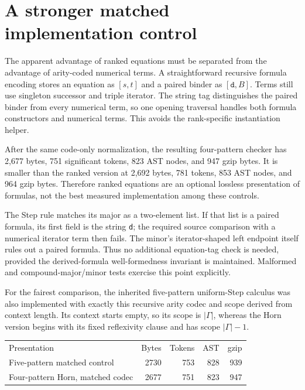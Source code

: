 \section{A stronger matched implementation control}

The apparent advantage of ranked equations must be separated from the
advantage of arity-coded numerical terms. A straightforward recursive
formula encoding stores an equation as $[s,t]$ and a paired binder as
$[\texttt{d},B]$. Terms still use singleton successor and triple iterator.
The string tag distinguishes the paired binder from every numerical term,
so one opening traversal handles both formula constructors and numerical
terms. This avoids the rank-specific instantiation helper.

After the same code-only normalization, the resulting four-pattern
checker has 2,677 bytes, 751 significant tokens, 823 AST nodes, and
947 gzip bytes. It is smaller than the ranked version at 2,692 bytes,
781 tokens, 853 AST nodes, and 964 gzip bytes.
Therefore ranked equations are an optional lossless presentation of
formulas, not the best measured implementation among these controls.

The Step rule matches its major as a two-element list. If that list is
a paired formula, its first field is the string \texttt{d}; the required
source comparison with a numerical iterator term then fails.
The minor's iterator-shaped left endpoint itself rules out a paired
formula. Thus no additional equation-tag check is needed, provided the
derived-formula well-formedness invariant is maintained.
Malformed and compound-major/minor tests exercise this point explicitly.

For the fairest comparison, the inherited five-pattern uniform-Step
calculus was also implemented with exactly this recursive arity codec
and scope derived from context length. Its context starts empty, so
its scope is $\lvert\Gamma\rvert$, whereas the Horn version begins
with its fixed reflexivity clause and has scope
$\lvert\Gamma\rvert-1$.

\begin{center}
\begin{tabular}{lrrrr}
Presentation & Bytes & Tokens & AST & gzip\\
Five-pattern matched control & 2730 & 753 & 828 & 939\\
Four-pattern Horn, matched codec & 2677 & 751 & 823 & 947
\end{tabular}
\end{center}

